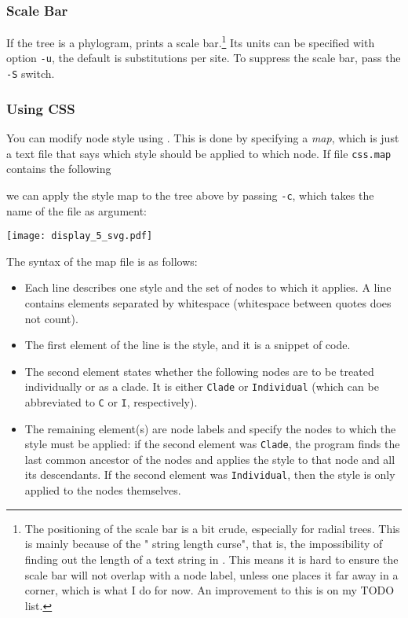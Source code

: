 \subsubsection{Scale Bar}

If the tree is a phylogram, \display{} prints a scale bar.\footnote{The
positioning of the scale bar is a bit crude, especially for radial trees. This
is mainly because of the "\svg{} string length curse", that is, the
impossibility of finding out the length of a text string in \svg. This means it
is hard to ensure the scale bar will not overlap with a node label, unless one
places it far away in a corner, which is what I do for now. An improvement to
this is on my TODO list.} Its units can be specified with option \texttt{-u},
the default is substitutions per site. To suppress the scale bar, pass the
\texttt{-S} switch.

\subsubsection{Using CSS}
\label{sct_display_svg_css}

You can modify node style using \css. This is done by specifying a
\textit{\css{} map}, which is just a text file that says which style should be
applied to which node. If file \texttt{css.map} contains the following
\begin{quote}  \end{quote} we can apply the style map to
the tree above by passing \texttt{-c}, which takes the name of the \css{} file
as argument:



\begin{center}
 \texttt{[image: display\_5\_svg.pdf]}
\end{center}

The syntax of the \css{} map file is as follows:
\begin{itemize}
	\item Each line describes one style and the set of nodes to which it applies.
	A line contains elements separated by whitespace (whitespace between quotes
	does not count). 
	\item The first element of the line is the style, and it is a snippet of
	\css{} code. 
	\item The second element states whether the following nodes are to be treated
	individually or as a clade. It is either \texttt{Clade} or
	\texttt{Individual} (which can be abbreviated to \texttt{C} or \texttt{I},
	respectively).
	\item The remaining element(s) are node labels and specify the nodes to which
	the style must be applied: if the second element was \texttt{Clade}, the
	program finds the last common ancestor of the nodes and applies the style to
	that node and all its descendants. If the second element was
	\texttt{Individual}, then the style is only applied to the nodes themselves.
\end{itemize}

